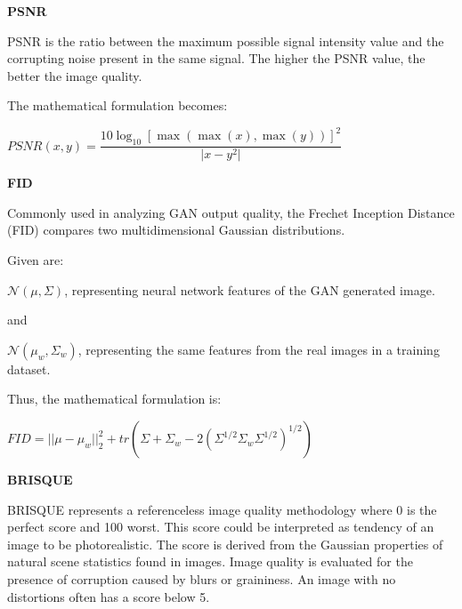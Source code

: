 \vspace{6mm}

\textbf{PSNR}


PSNR is the ratio between the maximum possible signal intensity value and the corrupting noise present in the same signal. 
The higher the PSNR value, the better the image quality. \citep{Metrics}


The mathematical formulation becomes:
\vspace{3mm}

\begin{center}
$PSNR(x,y)=\dfrac{10\log_{10}[\max(\max(x),\max(y))]^2}{\vert{x-y}^2\vert}$
\end{center}

\newpage

\textbf{FID}


Commonly used in analyzing GAN output quality, the Frechet Inception Distance (FID) compares two multidimensional Gaussian distributions. 

Given are:


$\mathcal{N}(\mu ,\Sigma )$, representing neural network features of the GAN generated image.

and 

$\mathcal{N}(\mu_w,\Sigma_w)$, representing the same features from the real images in a training dataset. 
\citep{FID}

\vspace{3mm}

Thus, the mathematical formulation is:


\begin{center}
$FID=||\mu -\mu _{w}||_{2}^{2} + tr(\Sigma +\Sigma _{w}-2(\Sigma ^{1/2}\Sigma _{w}\Sigma ^{1/2})^{1/2})$
\end{center}

\vspace{5mm}

\textbf{BRISQUE}


BRISQUE represents a referenceless image quality methodology where 0 is the perfect score and 100 worst.
This score could be interpreted as tendency of an image to be photorealistic. The score is derived from
the Gaussian properties of natural scene statistics found in images.
Image quality is evaluated for the presence of corruption caused by blurs or graininess. 
An image with no distortions often has a score below 5. \citep{BRISQUE}

\vspace{3mm}

